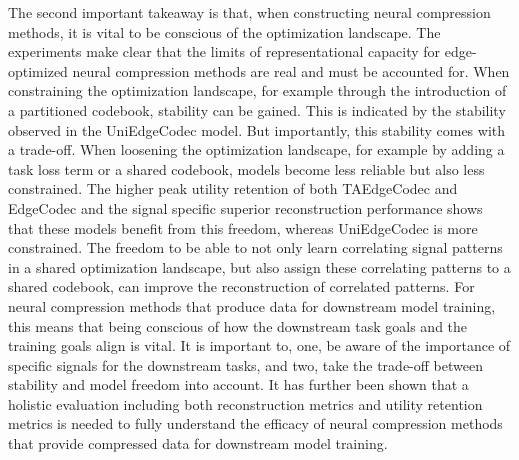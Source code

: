 The second important takeaway is that, when constructing neural compression methods, it is vital to be conscious of the optimization landscape. The experiments make clear that the limits of representational capacity for edge-optimized neural compression methods are real and must be accounted for. When constraining the optimization landscape, for example through the introduction of a partitioned codebook, stability can be gained. This is indicated by the stability observed in the UniEdgeCodec model. But importantly, this stability comes with a trade-off. When loosening the optimization landscape, for example by adding a task loss term or a shared codebook, models become less reliable but also less constrained. The higher peak utility retention of both TAEdgeCodec and EdgeCodec and the signal specific superior reconstruction performance shows that these models benefit from this freedom, whereas UniEdgeCodec is more constrained. The freedom to be able to not only learn correlating signal patterns in a shared optimization landscape, but also assign these correlating patterns to a shared codebook, can improve the reconstruction of correlated patterns. For neural compression methods that produce data for downstream model training, this means that being conscious of how the downstream task goals and the training goals align is vital. It is important to, one, be aware of the importance of specific signals for the downstream tasks, and two, take the trade-off between stability and model freedom into account. It has further been shown that a holistic evaluation including both reconstruction metrics and utility retention metrics is needed to fully understand the efficacy of neural compression methods that provide compressed data for downstream model training.